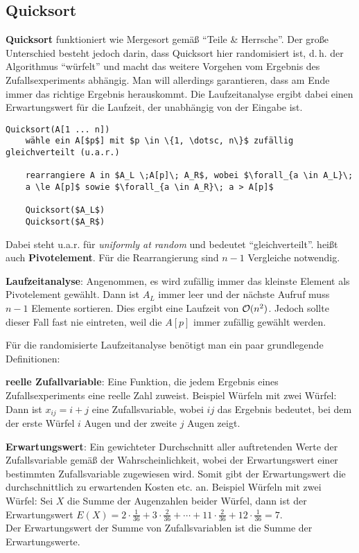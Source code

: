 \subsection{%
    Quicksort%
}

\textbf{Quicksort} funktioniert wie Mergesort gemäß "`Teile \& Herrsche"'.
Der große Unterschied besteht jedoch darin, dass Quicksort hier randomisiert
ist, d.\,h. der Algorithmus "`würfelt"' und macht das weitere Vorgehen
vom Ergebnis des Zufallsexperiments abhängig.
Man will allerdings garantieren, dass am Ende immer das richtige Ergebnis
herauskommt.
Die Laufzeitanalyse ergibt dabei einen Erwartungswert für die Laufzeit,
der unabhängig von der Eingabe ist.

\begin{lstlisting}
Quicksort(A[1 ... n])
    wähle ein A[$p$] mit $p \in \{1, \dotsc, n\}$ zufällig gleichverteilt (u.a.r.)

    rearrangiere A in $A_L \;A[p]\; A_R$, wobei $\forall_{a \in A_L}\;
    a \le A[p]$ sowie $\forall_{a \in A_R}\; a > A[p]$

    Quicksort($A_L$)
    Quicksort($A_R$)
\end{lstlisting}

Dabei steht u.a.r. für \emph{uniformly at random} und bedeutet
"`gleichverteilt"'.
 heißt auch \textbf{Pivotelement}.
Für die Rearrangierung sind $n - 1$ Vergleiche notwendig.

\linie

\textbf{Laufzeitanalyse}:
Angenommen, es wird zufällig immer das kleinste Element als Pivotelement
gewählt.
Dann ist $A_L$ immer leer und der nächste Aufruf muss $n - 1$ Elemente
sortieren.
Dies ergibt eine Laufzeit von $\mathcal{O}(n^2)$.
Jedoch sollte dieser Fall fast nie eintreten, weil die $A[p]$ immer zufällig
gewählt werden.

Für die randomisierte Laufzeitanalyse benötigt man ein paar grundlegende
Definitionen:

\textbf{reelle Zufallvariable}: Eine Funktion, die jedem Ergebnis eines
Zufallsexperiments eine reelle Zahl zuweist.
Beispiel Würfeln mit zwei Würfel:
Dann ist $x_{ij} = i + j$ eine Zufallsvariable, wobei $ij$ das Ergebnis
bedeutet, bei dem der erste Würfel $i$ Augen und der zweite $j$ Augen zeigt.

\textbf{Erwartungswert}: Ein gewichteter Durchschnitt aller auftretenden
Werte der Zufallsvariable gemäß der Wahrscheinlichkeit, wobei der
Erwartungswert einer bestimmten Zufallsvariable zugewiesen wird.
Somit gibt der Erwartungswert die durchschnittlich zu erwartenden Kosten
etc. an.
Beispiel Würfeln mit zwei Würfel:
Sei $X$ die Summe der Augenzahlen beider Würfel, dann ist
der Erwartungswert $E(X) = 2 \cdot \frac{1}{36} + 3 \cdot \frac{2}{36} +
\dotsb + 11 \cdot \frac{2}{36} + 12 \cdot \frac{1}{36} = 7$. \\
Der Erwartungswert der Summe von Zufallsvariablen ist die Summe
der Erwartungswerte.

